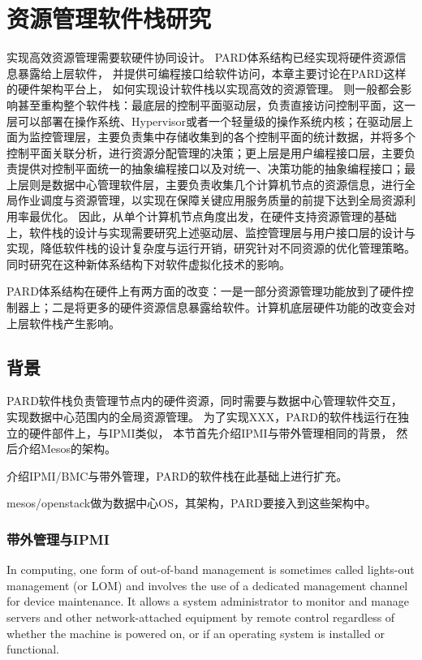 

\chapter{资源管理软件栈研究}
\label{chap:prm}

实现高效资源管理需要软硬件协同设计。
PARD体系结构已经实现将硬件资源信息暴露给上层软件，
并提供可编程接口给软件访问，本章主要讨论在PARD这样的硬件架构平台上，
如何实现设计软件栈以实现高效的资源管理。
则一般都会影响甚至重构整个软件栈：最底层的控制平面驱动层，负责直接访问控制平面，这一层可以部署在操作系统、Hypervisor或者一个轻量级的操作系统内核；在驱动层上面为监控管理层，主要负责集中存储收集到的各个控制平面的统计数据，并将多个控制平面关联分析，进行资源分配管理的决策；更上层是用户编程接口层，主要负责提供对控制平面统一的抽象编程接口以及对统一、决策功能的抽象编程接口；最上层则是数据中心管理软件层，主要负责收集几个计算机节点的资源信息，进行全局作业调度与资源管理，以实现在保障关键应用服务质量的前提下达到全局资源利用率最优化。
因此，从单个计算机节点角度出发，在硬件支持资源管理的基础上，软件栈的设计与实现需要研究上述驱动层、监控管理层与用户接口层的设计与实现，降低软件栈的设计复杂度与运行开销，研究针对不同资源的优化管理策略。同时研究在这种新体系结构下对软件虚拟化技术的影响。

PARD体系结构在硬件上有两方面的改变：一是一部分资源管理功能放到了硬件控制器上；二是将更多的硬件资源信息暴露给软件。计算机底层硬件功能的改变会对上层软件栈产生影响。

\section{背景}

PARD软件栈负责管理节点内的硬件资源，同时需要与数据中心管理软件交互，
实现数据中心范围内的全局资源管理。
为了实现XXX，PARD的软件栈运行在独立的硬件部件上，与IPMI类似，
本节首先介绍IPMI\cite{ipmi}与带外管理相同的背景，
然后介绍Mesos\cite{Hindman:2011:Mesos}的架构。

介绍IPMI/BMC与带外管理，PARD的软件栈在此基础上进行扩充。

mesos/openstack做为数据中心OS，其架构，PARD要接入到这些架构中。


\subsection{带外管理与IPMI}

In computing, one form of out-of-band management is sometimes called lights-out management (or LOM) and involves the use of a dedicated management channel for device maintenance. It allows a system administrator to monitor and manage servers and other network-attached equipment by remote control regardless of whether the machine is powered on, or if an operating system is installed or functional.

